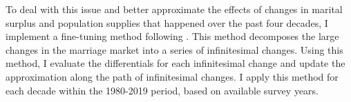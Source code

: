 
To deal with this issue and better approximate the effects of changes in marital surplus and population supplies that happened over the past four decades, I implement a fine-tuning method following \cite{Judd_1998_book}. This method decomposes the large changes in the marriage market into a series of infinitesimal changes. Using this method, I evaluate the differentials for each infinitesimal change and update the approximation along the path of infinitesimal changes. I apply this method for each decade within the 1980-2019 period, based on available survey years. 

